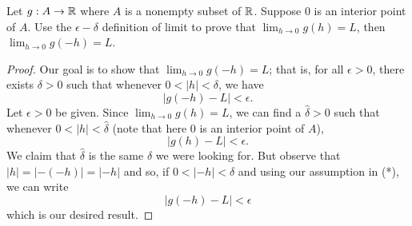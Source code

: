\documentclass[a4paper]{article}
\begin{document}
\begin{problem}
    Let \( g: A \to \mathbb{R}  \) where \( A  \) is a nonempty subset of \( \mathbb{R}  \). Suppose \( 0  \) is an interior point of \( A  \). Use the \( \epsilon-\delta \) definition of limit to prove that \( \lim_{ h \to 0 }  g(h) = L  \), then \( \lim_{ h \to 0 }  g(-h) = L  \). 
\end{problem}
\begin{proof}
Our goal is to show that \( \lim_{ h \to 0 }  g(-h) = L \); that is, for all \( \epsilon > 0  \), there exists \( \delta > 0  \) such that whenever \( 0 < | h  |  < \delta \), we have 
\[  | g(-h) - L  |  < \epsilon. \]
Let \( \epsilon > 0  \) be given. Since \( \lim_{ h \to 0 } g(h) = L  \), we can find a \( \hat{\delta} > 0  \) such that whenever \( 0 < | h  |  < \hat{\delta} \) (note that here \( 0  \) is an interior point of \( A  \)), 
\[  | g(h) - L  | < \epsilon. \tag{*}  \]
We claim that \( \hat{\delta} \) is the same \( \delta  \) we were looking for. But observe that \( | h  |  = | -(-h) | = | -h  |  \) and so, if \( 0 < | -h  |  < \delta \) and using our assumption in (*), we can write
\[  | g(-h) - L  | < \epsilon \]
which is our desired result.
\end{proof}
\end{document}
